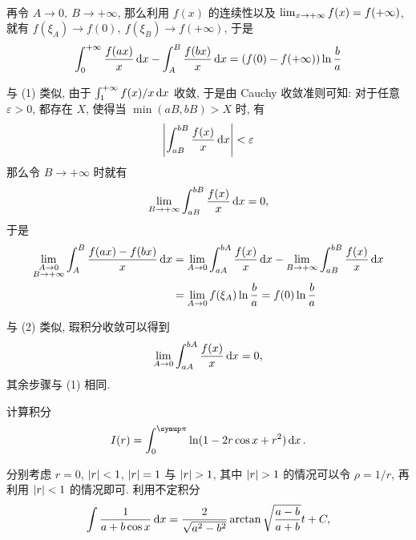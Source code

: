 \begin{exercise}[series=exer]
\begin{answer}
\begin{answersheet}
\begin{align*}
      \end{align*}
      再令 $ A \to 0,\ B \to +\infty $, 那么利用 $ f(x) $ 的连续性以及 $ \lim_{x \to +\infty}f(x) = f(+\infty) $, 就有 $ f(\xi_{A}) \to f(0),\ f(\xi_{B}) \to f(+\infty) $, 于是
      \begin{align*}
        \int_{0}^{+\infty} \frac{f(ax)}{x} \dx* - \int_{A}^{B} \frac{f(bx)}{x} \dx* = (f(0) - f(+\infty)) \ln \frac{b}{a}
      \end{align*}
      \item 与 (1) 类似, 由于 $ \int_{1}^{+\infty} f(x)/x \dx* $ 收敛, 于是由 Cauchy 收敛准则可知: 对于任意 $ \varepsilon > 0 $, 都存在 $ X $, 使得当 $ \min(aB, bB) > X $ 时, 有
      \begin{align*}
        \abs{\int_{aB}^{bB} \frac{f(x)}{x} \dx*} < \varepsilon
      \end{align*}
      那么令 $ B \to +\infty $ 时就有
      \begin{align*}
        \limit{B}{+\infty} \int_{aB}^{bB} \frac{f(x)}{x} \dx* = 0,
      \end{align*}
      于是
      \begin{align*}
        \lim_{\substack{A \to 0 \\ B \to +\infty}} \int_{A}^{B} \frac{f(ax) - f(bx)}{x} \dx* 
        & = \limit{A}{0} \int_{aA}^{bA} \frac{f(x)}{x} \dx* - \limit{B}{+\infty} \int_{aB}^{bB} \frac{f(x)}{x} \dx* \\
        & = \limit{A}{0} f(\xi_{A}) \ln \frac{b}{a} = f(0) \ln \frac{b}{a}
      \end{align*}
      \item 与 (2) 类似, 瑕积分收敛可以得到
      \begin{align*}
        \limit{A}{0} \int_{aA}^{bA} \frac{f(x)}{x} \dx* = 0,
      \end{align*}
      其余步骤与 (1) 相同.
    \end{answersheet}
  \end{answer}
  \item 计算积分
  \begin{align*}
      I(r) = \int_{0}^{\pi} \ln(1 - 2 r \cos x + r^{2}) \dx*.
  \end{align*}
  \begin{hint}
      分别考虑 $ r = 0 $, $ \abs{r} < 1 $, $ \abs{r} = 1 $ 与 $ \abs{r} > 1 $, 其中 $ \abs{r} > 1 $ 的情况可以令 $ \rho = 1/r $, 再利用 $ \abs{r} < 1 $ 的情况即可.
      利用不定积分
      \begin{align*}
          \int \frac{1}{a + b\cos x} \dx* = \frac{2}{\sqrt{a^{2} - b^{2}}}\arctan\sqrt{\frac{a - b}{a + b}}t + C,

\end{align*}
\end{hint}
\end{exercise}
